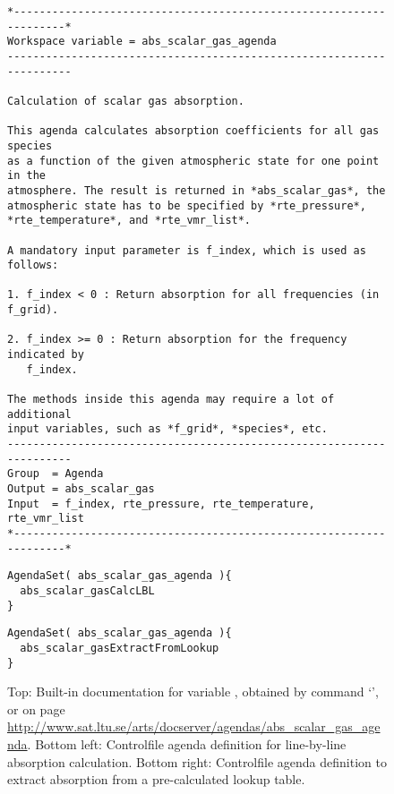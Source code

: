 \begin{figure}
\footnotesize
\begin{lstlisting}
*-------------------------------------------------------------------*
Workspace variable = abs_scalar_gas_agenda
---------------------------------------------------------------------

Calculation of scalar gas absorption.

This agenda calculates absorption coefficients for all gas species 
as a function of the given atmospheric state for one point in the 
atmosphere. The result is returned in *abs_scalar_gas*, the 
atmospheric state has to be specified by *rte_pressure*, 
*rte_temperature*, and *rte_vmr_list*.

A mandatory input parameter is f_index, which is used as follows:

1. f_index < 0 : Return absorption for all frequencies (in f_grid).

2. f_index >= 0 : Return absorption for the frequency indicated by
   f_index. 

The methods inside this agenda may require a lot of additional
input variables, such as *f_grid*, *species*, etc.
---------------------------------------------------------------------
Group  = Agenda
Output = abs_scalar_gas
Input  = f_index, rte_pressure, rte_temperature, rte_vmr_list
*-------------------------------------------------------------------*
\end{lstlisting}
\begin{minipage}[t]{0.48\hsize}
\begin{lstlisting}
AgendaSet( abs_scalar_gas_agenda ){
  abs_scalar_gasCalcLBL
}
\end{lstlisting}
\end{minipage}
\hspace*{\fill}
\begin{minipage}[t]{0.48\hsize}
\begin{lstlisting}
AgendaSet( abs_scalar_gas_agenda ){
  abs_scalar_gasExtractFromLookup
}
\end{lstlisting}
\end{minipage}
\caption{Top: Built-in documentation for variable
  , obtained by command
  `', or on page
  \url{http://www.sat.ltu.se/arts/docserver/agendas/abs_scalar_gas_agenda}. Bottom
  left: Controlfile agenda definition for line-by-line absorption
  calculation. Bottom right: Controlfile agenda definition to extract
  absorption from a pre-calculated lookup table.}
\label{fig:agendas}
\end{figure}

